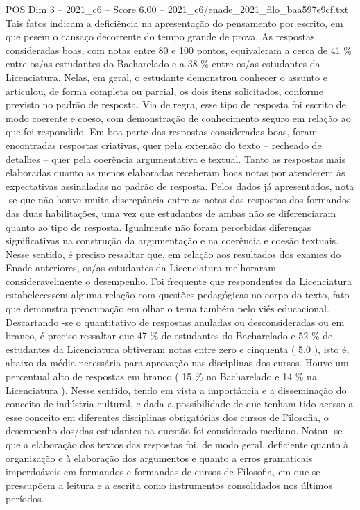\begin{textsample}{POS Dim 3 – 2021\_c6 – Score 6.00 – 2021\_c6/enade\_2021\_filo\_baa597e9cf.txt}
Tais fatos indicam a deficiência na apresentação do pensamento por escrito, em que pesem o cansaço decorrente do tempo grande de prova.
As respostas consideradas boas, com notas entre 80 e 100 pontos, equivaleram a cerca de 41 \% entre os/as estudantes do Bacharelado e a 38 \% entre os/as estudantes da Licenciatura.
Nelas, em geral, o estudante demonstrou conhecer o assunto e articulou, de forma completa ou parcial, os dois itens solicitados, conforme previsto no padrão de resposta.
Via de regra, esse tipo de resposta foi escrito de modo coerente e coeso, com demonstração de conhecimento seguro em relação ao que foi respondido.
Em boa parte das respostas consideradas boas, foram encontradas respostas criativas, quer pela extensão do texto – recheado de detalhes – quer pela coerência argumentativa e textual.
Tanto as respostas mais elaboradas quanto as menos elaboradas receberam boas notas por atenderem às expectativas assinaladas no padrão de resposta.
Pelos dados já apresentados, nota -se que não houve muita discrepância entre as notas das respostas dos formandos das duas habilitações, uma vez que estudantes de ambas não se diferenciaram quanto ao tipo de resposta.
Igualmente não foram percebidas diferenças significativas na construção da argumentação e na coerência e coesão textuais.
Nesse sentido, é preciso ressaltar que, em relação aos resultados dos exames do Enade anteriores, os/as estudantes da Licenciatura melhoraram consideravelmente o desempenho.
Foi frequente que respondentes da Licenciatura estabelecessem alguma relação com questões pedagógicas no corpo do texto, fato que demonstra preocupação em olhar o tema também pelo viés educacional.
Descartando -se o quantitativo de respostas anuladas ou desconsideradas ou em branco, é preciso ressaltar que 47 \% de estudantes do Bacharelado e 52 \% de estudantes da Licenciatura obtiveram notas entre zero e cinquenta ( 5,0 ), isto é, abaixo da média necessária para aprovação nas disciplinas dos cursos.
Houve um percentual alto de respostas em branco ( 15 \% no Bacharelado e 14 \% na Licenciatura ).
Nesse sentido, tendo em vista a importância e a disseminação do conceito de indústria cultural, e dada a possibilidade de que tenham tido acesso a esse conceito em diferentes disciplinas obrigatórias dos cursos de Filosofia, o desempenho dos/das estudantes na questão foi considerado mediano.
Notou -se que a elaboração dos textos das respostas foi, de modo geral, deficiente quanto à organização e à elaboração dos argumentos e quanto a erros gramaticais imperdoáveis em formandos e formandas de cursos de Filosofia, em que se pressupõem a leitura e a escrita como instrumentos consolidados nos últimos períodos.

\end{textsample}
